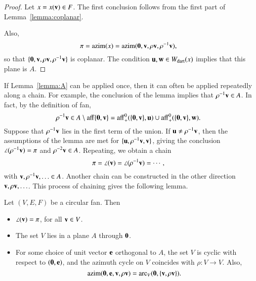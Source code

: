 \begin{proof} Let $x = x({\mathbf v})\in F$.  The first conclusion follows from the first part of Lemma~\ref{lemma:coplanar}.  

Also,
$$
\pi={\operatorname{azim}}(x) = {\operatorname{azim}}({\mathbf 0},{\mathbf v},\rho {\mathbf v},\rho^{-1}{\mathbf v}),
$$
so that $\{{\mathbf 0},{\mathbf v},\rho {\mathbf v},\rho^{-1} {\mathbf v}\}$ is coplanar.  The condition
 ${\mathbf u},{\mathbf w}\in W_{\text{dart}}(x)$ implies that this plane is $A$.
\end{proof}

If Lemma~\ref{lemma:A} can be applied once, then it can often be applied repeatedly along a chain.  For example, the conclusion of the lemma implies
that $\rho^{-1} {\mathbf v} \in A$.  In fact, by the definition of fan, 
$$\rho^{-1}{\mathbf v} \in A \setminus {\operatorname{aff}}\{{\mathbf 0},{\mathbf v}\} = {\operatorname{aff}}^0_+(\{{\mathbf 0},{\mathbf v}\},{\mathbf u}) \cup {\operatorname{aff}}^0_+(\{{\mathbf 0},{\mathbf v}\},{\mathbf w}).$$
Suppose that $\rho^{-1} {\mathbf v}$ lies in the first term of the union.  If ${\mathbf u}\ne \rho^{-1}{\mathbf v}$, then the assumptions of the lemma
are met for $\{{\mathbf u},\rho^{-1} {\mathbf v},{\mathbf v}\}$, giving the conclusion $\angle(\rho^{-1} {\mathbf v})=\pi$ and $\rho^{-2}{\mathbf v}\in A$.  Repeating, we obtain a chain
$$
\pi=\angle({\mathbf v}) = \angle(\rho^{-1} {\mathbf v}) = \cdots,
$$
with ${\mathbf v},\rho^{-1}{\mathbf v},\ldots\in A$.  Another chain can be constructed in the other direction ${\mathbf v},\rho {\mathbf v},\ldots$.
This process of chaining gives the following lemma.

\begin{lemma}\label{lemma:circular}
Let $(V,E,F)$ be a circular fan. Then
\begin{itemize}
\item $\angle({\mathbf v})=\pi$, for all ${\mathbf v}\in V$.
\item The set $V$ lies in a plane $A$ through ${\mathbf 0}$.
\item For some choice of unit vector ${\mathbf e}$ orthogonal to $A$, the set $V$ is cyclic with respect to
$({\mathbf 0},{\mathbf e})$, and the azimuth cycle on $V$ coincides with $\rho:V\to V$.
Also,
$$
{\operatorname{azim}}({\mathbf 0},{\mathbf e},{\mathbf v},\rho{\mathbf v}) = {\operatorname{arc}}_V({\mathbf 0},\{{\mathbf v},\rho {\mathbf v}\}).
$$
\end{itemize}
\end{lemma}

